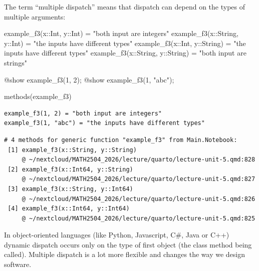 \documentclass[
]{article}
\newenvironment{Shaded}{\begin{snugshade}}{\end{snugshade}}
\newcommand{\DataTypeTok}[1]{\textcolor[rgb]{0.68,0.00,0.00}{#1}}
\newcommand{\FloatTok}[1]{\textcolor[rgb]{0.68,0.00,0.00}{#1}}
\newcommand{\FunctionTok}[1]{\textcolor[rgb]{0.28,0.35,0.67}{#1}}
\newcommand{\NormalTok}[1]{\textcolor[rgb]{0.00,0.23,0.31}{#1}}
\newcommand{\OperatorTok}[1]{\textcolor[rgb]{0.37,0.37,0.37}{#1}}
\newcommand{\PreprocessorTok}[1]{\textcolor[rgb]{0.68,0.00,0.00}{#1}}
\newcommand{\StringTok}[1]{\textcolor[rgb]{0.13,0.47,0.30}{#1}}
\begin{document}
The term ``multiple dispatch'' means that dispatch can depend on the
types of multiple arguments:

\begin{Shaded}
\begin{Highlighting}[]
\FunctionTok{example\_f3}\NormalTok{(x}\OperatorTok{::}\DataTypeTok{Int}\NormalTok{, y}\OperatorTok{::}\DataTypeTok{Int}\NormalTok{) }\OperatorTok{=} \StringTok{"both input are integers"}
\FunctionTok{example\_f3}\NormalTok{(x}\OperatorTok{::}\DataTypeTok{String}\NormalTok{, y}\OperatorTok{::}\DataTypeTok{Int}\NormalTok{) }\OperatorTok{=} \StringTok{"the inputs have different types"}
\FunctionTok{example\_f3}\NormalTok{(x}\OperatorTok{::}\DataTypeTok{Int}\NormalTok{, y}\OperatorTok{::}\DataTypeTok{String}\NormalTok{) }\OperatorTok{=} \StringTok{"the inputs have different types"}
\FunctionTok{example\_f3}\NormalTok{(x}\OperatorTok{::}\DataTypeTok{String}\NormalTok{, y}\OperatorTok{::}\DataTypeTok{String}\NormalTok{) }\OperatorTok{=} \StringTok{"both input are strings"}

\PreprocessorTok{@show} \FunctionTok{example\_f3}\NormalTok{(}\FloatTok{1}\NormalTok{, }\FloatTok{2}\NormalTok{);}
\PreprocessorTok{@show} \FunctionTok{example\_f3}\NormalTok{(}\FloatTok{1}\NormalTok{, }\StringTok{"abc"}\NormalTok{);}

\FunctionTok{methods}\NormalTok{(example\_f3)}
\end{Highlighting}
\end{Shaded}

\begin{verbatim}
example_f3(1, 2) = "both input are integers"
example_f3(1, "abc") = "the inputs have different types"
\end{verbatim}

\begin{verbatim}
# 4 methods for generic function "example_f3" from Main.Notebook:
 [1] example_f3(x::String, y::String)
     @ ~/nextcloud/MATH2504_2026/lecture/quarto/lecture-unit-5.qmd:828
 [2] example_f3(x::Int64, y::String)
     @ ~/nextcloud/MATH2504_2026/lecture/quarto/lecture-unit-5.qmd:827
 [3] example_f3(x::String, y::Int64)
     @ ~/nextcloud/MATH2504_2026/lecture/quarto/lecture-unit-5.qmd:826
 [4] example_f3(x::Int64, y::Int64)
     @ ~/nextcloud/MATH2504_2026/lecture/quarto/lecture-unit-5.qmd:825
\end{verbatim}

In object-oriented languages (like Python, Javascript, C\#, Java or C++)
dynamic dispatch occurs only on the type of first object (the class
method being called). Multiple dispatch is a lot more flexible and
changes the way we design software.
\end{document}
